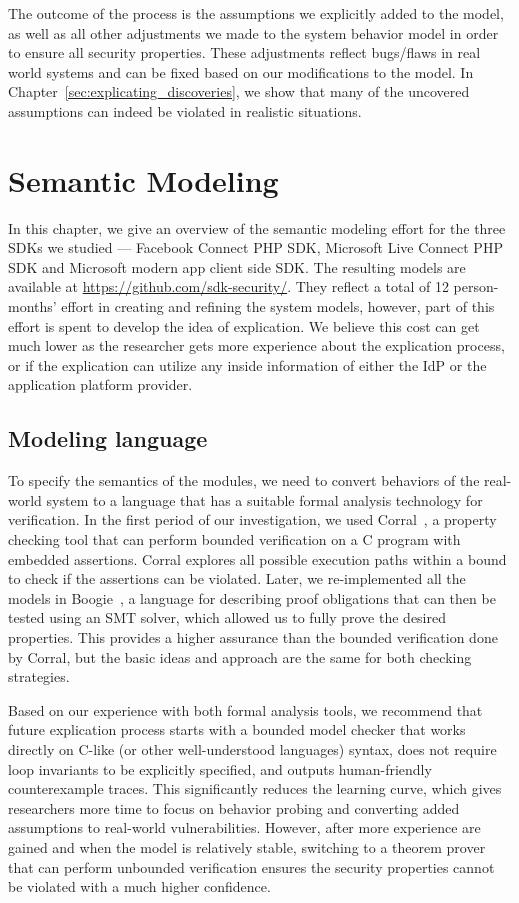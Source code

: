 The outcome of the process is the assumptions we explicitly added to the model, as well as all other adjustments we made to the system behavior model in order to ensure all security properties.  These adjustments reflect bugs/flaws in real world systems and can be fixed based on our modifications to the model.  In Chapter~\ref{sec:explicating_discoveries}, we show that many of the uncovered assumptions can indeed be violated in realistic situations. 

\section{Semantic Modeling}
\label{sec:explicating_semantic_modeling}
In this chapter, we give an overview of the semantic modeling effort for the three SDKs we studied --- Facebook Connect PHP SDK, Microsoft Live Connect PHP SDK and Microsoft modern app client side SDK.  The resulting models are available at \url{https://github.com/sdk-security/}. They reflect a total of 12 person-months' effort in creating and refining the system models, however, part of this effort is spent to develop the idea of explication.  We believe this cost can get much lower as the researcher gets more experience about the explication process, or if the explication can utilize any inside information of either the IdP or the application platform provider.

\subsection{Modeling language}

To specify the semantics of the modules, we need to convert behaviors of the real-world system to a language that has a suitable formal analysis technology for verification.  In the first period of our investigation, we used Corral~\cite{Lal:2012:SRM:2362216.2362257}, a property checking tool that can perform bounded verification on a C program with embedded assertions.  Corral explores all possible execution paths within a bound to check if the assertions can be violated.  Later, we re-implemented all the models in Boogie~\cite{Boogie}, a language for describing proof obligations that can then be tested using an SMT solver, which allowed us to fully prove the desired properties.  This provides a higher assurance than the bounded verification done by Corral, but the basic ideas and approach are the same for both checking strategies.

Based on our experience with both formal analysis tools, we recommend that future explication process starts with a bounded model checker that works directly on C-like (or other well-understood languages) syntax, does not require loop invariants to be explicitly specified, and outputs human-friendly counterexample traces.  This significantly reduces the learning curve, which gives researchers more time to focus on behavior probing and converting added assumptions to real-world vulnerabilities.  However, after more experience are gained and when the model is relatively stable, switching to a theorem prover that can perform unbounded verification ensures the security properties cannot be violated with a much higher confidence.

